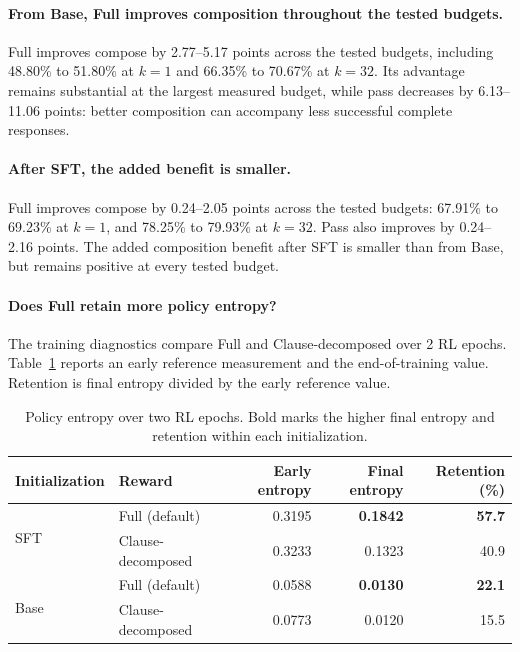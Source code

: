 \paragraph{From Base, Full improves composition throughout the tested budgets.}
Full improves compose by 2.77--5.17 points across the tested budgets,
including 48.80\% to 51.80\% at \(k=1\) and 66.35\% to 70.67\% at
\(k=32\).  Its advantage remains substantial at the largest measured
budget, while pass decreases by 6.13--11.06 points: better composition
can accompany less successful complete responses.

\paragraph{After SFT, the added benefit is smaller.}
Full improves compose by 0.24--2.05 points across the tested budgets:
67.91\% to 69.23\% at \(k=1\), and 78.25\% to 79.93\% at \(k=32\).
Pass also improves by 0.24--2.16 points. The added composition benefit after
SFT is smaller than from Base, but remains positive at every tested budget.

\paragraph{Does Full retain more policy entropy?}

The training diagnostics compare Full and Clause-decomposed over
2 RL epochs. Table~\ref{tab:shapley-entropy} reports an early reference
measurement and the end-of-training value. Retention is final entropy
divided by the early reference value.

\begin{table}[H]
\centering
\small
\caption{Policy entropy over two RL epochs. Bold marks the higher final entropy and retention within each initialization.}
\label{tab:shapley-entropy}
\begin{tabular}{llrrr}
\toprule
\rowcolor{algobg}
Initialization & Reward & Early entropy & Final entropy & Retention (\%) \\
\midrule
\multirow{2}{*}{SFT} & Full (default) & 0.3195 & \textbf{0.1842} & \textbf{57.7} \\
 & Clause-decomposed & 0.3233 & 0.1323 & 40.9 \\
\midrule
\multirow{2}{*}{Base} & Full (default) & 0.0588 & \textbf{0.0130} & \textbf{22.1} \\
 & Clause-decomposed & 0.0773 & 0.0120 & 15.5 \\
\bottomrule
\end{tabular}
\end{table}

